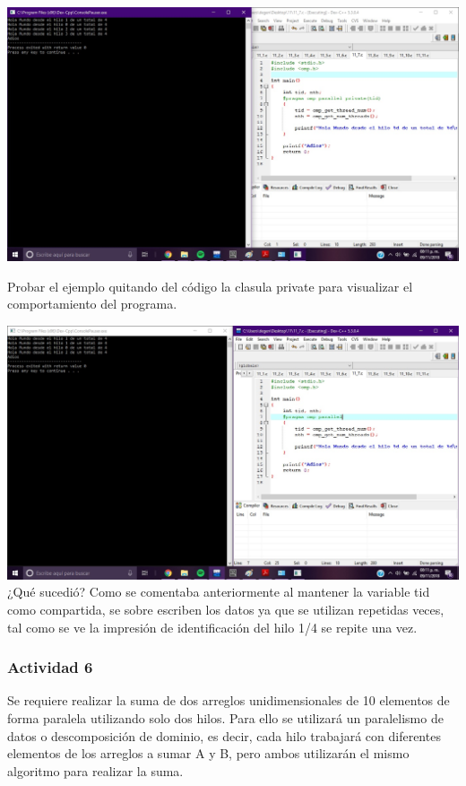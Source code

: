 \documentclass[12pt,letterpaper]{article}
\begin{document}
\begin{flushleft}
\includegraphics[scale=.5]{ejercicio5.jpg} 

\end{flushleft}

Probar el ejemplo quitando del código la clasula private para visualizar el comportamiento del programa.


\includegraphics[scale=.5]{ejercicio51.jpg}
¿Qué sucedió? Como se comentaba anteriormente al mantener la variable tid como compartida, se sobre escriben los datos ya que se utilizan repetidas veces, tal como se ve la impresión de identificación del hilo 1/4 se repite una vez. 


\subsubsection*{Actividad 6}
Se requiere realizar la suma de dos arreglos unidimensionales de 10 elementos de forma paralela utilizando solo dos hilos. Para ello se utilizará un paralelismo de datos o descomposición de dominio, es decir, cada hilo trabajará con diferentes elementos de los arreglos a sumar A y B, pero ambos utilizarán el mismo algoritmo para realizar la suma.
\end{document}
